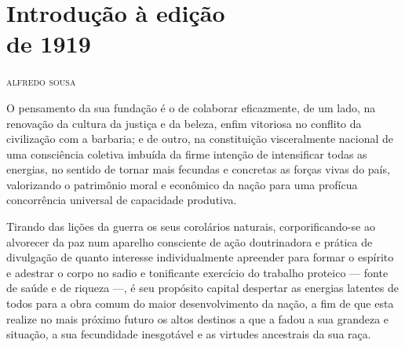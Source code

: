 \chapter*{Introdução à edição\\ de 1919}


\begin{flushright}
\textsc{alfredo sousa}
\end{flushright}

\noindent{}

O pensamento da sua fundação é o de colaborar eficazmente, de um lado,
na renovação da cultura da justiça e da beleza, enfim vitoriosa no
conflito da civilização com a barbaria; e de outro, na constituição
visceralmente nacional de uma consciência coletiva imbuída da firme
intenção de intensificar todas as energias, no sentido de tornar mais
fecundas e concretas as forças vivas do país, valorizando o patrimônio
moral e econômico da nação para uma profícua concorrência universal de
capacidade produtiva.


Tirando das lições da guerra os seus corolários naturais,
corporificando-se ao alvorecer da paz num aparelho consciente de ação
doutrinadora e prática de divulgação de quanto interesse individualmente
apreender para formar o espírito e adestrar o corpo no sadio e
tonificante exercício do trabalho proteico --- fonte de saúde e de
riqueza ---, é seu propósito capital despertar as energias latentes de
todos para a obra comum do maior desenvolvimento da nação, a fim de que
esta realize no mais próximo futuro os altos destinos a que a fadou a
sua grandeza e situação, a sua fecundidade inesgotável e as virtudes
ancestrais da sua raça.

